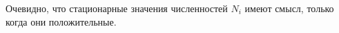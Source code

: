         Очевидно, что стационарные значения численностей \(N_i\) имеют смысл, только когда они положительные.







